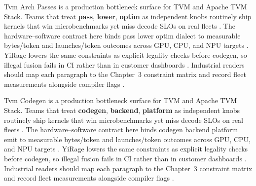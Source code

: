 Tvm Arch Passes is a production bottleneck surface for TVM and Apache TVM Stack. Teams that treat \textbf{pass}, \textbf{lower}, \textbf{optim} as independent knobs routinely ship kernels that win microbenchmarks yet miss decode SLOs on real fleets \citep{semianalysis2024tma,dlbook}. The hardware--software contract here binds pass lower optim dialect to measurable bytes/token and launches/token outcomes across GPU, CPU, and NPU targets \citep{amd2024xdna,dao2022flashattention}. YiRage lowers the same constraints as explicit legality checks before codegen, so illegal fusion fails in CI rather than in customer dashboards \citep{amd2024aie,kwon2023vllm}. Industrial readers should map each paragraph to the Chapter~3 constraint matrix and record fleet measurements alongside compiler flags \citep{dlbook,nvidia2024cudagraphs}.

Tvm Codegen is a production bottleneck surface for TVM and Apache TVM Stack. Teams that treat \textbf{codegen}, \textbf{backend}, \textbf{platform} as independent knobs routinely ship kernels that win microbenchmarks yet miss decode SLOs on real fleets \citep{amd2024xdna,dao2022flashattention}. The hardware--software contract here binds codegen backend platform emit to measurable bytes/token and launches/token outcomes across GPU, CPU, and NPU targets \citep{amd2024aie,kwon2023vllm}. YiRage lowers the same constraints as explicit legality checks before codegen, so illegal fusion fails in CI rather than in customer dashboards \citep{dlbook,nvidia2024cudagraphs}. Industrial readers should map each paragraph to the Chapter~3 constraint matrix and record fleet measurements alongside compiler flags \citep{dao2022flashattention,liu2024deepseekv3}.

